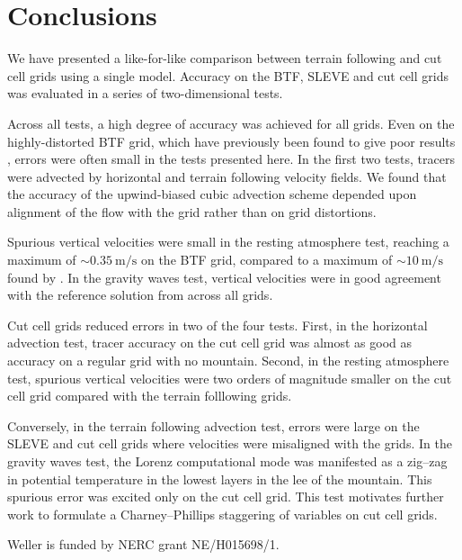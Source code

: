 \documentclass[twocol]{ametsoc}
\begin{document}
\section{Conclusions}
We have presented a like-for-like comparison between terrain following and cut cell grids using a single model.  Accuracy on the BTF, SLEVE and cut cell grids was evaluated in a series of two-dimensional tests.

Across all tests, a high degree of accuracy was achieved for all grids.  Even on the highly-distorted BTF grid, which have previously been found to give poor results \citep{schaer2002,klemp2011,good2014}, errors were often small in the tests presented here.  In the first two tests, tracers were advected by horizontal and terrain following velocity fields.  We found that the accuracy of the upwind-biased cubic advection scheme depended upon alignment of the flow with the grid rather than on grid distortions.

Spurious vertical velocities were small in the resting atmosphere test, reaching a maximum of $\sim \SI{0.35}{\meter\per\second}$ on the BTF grid, compared to a maximum of $\sim \SI{10}{\meter\per\second}$ found by \citet{klemp2011}.  In the gravity waves test, vertical velocities were in good agreement with the reference solution from \citet{melvin2010} across all grids.

Cut cell grids reduced errors in two of the four tests.  First, in the horizontal advection test, tracer accuracy on the cut cell grid was almost as good as accuracy on a regular grid with no mountain.  Second, in the resting atmosphere test, spurious vertical velocities were two orders of magnitude smaller on the cut cell grid compared with the terrain folllowing grids.

Conversely, in the terrain following advection test, errors were large on the SLEVE and cut cell grids where velocities were misaligned with the grids.  In the gravity waves test, the Lorenz computational mode was manifested as a zig--zag in potential temperature in the lowest layers in the lee of the mountain.  This spurious error was excited only on the cut cell grid.  This test motivates further work to formulate a Charney--Phillips staggering of variables on cut cell grids.

\acknowledgments
{} Weller is funded by NERC grant NE/H015698/1.







\end{document}
